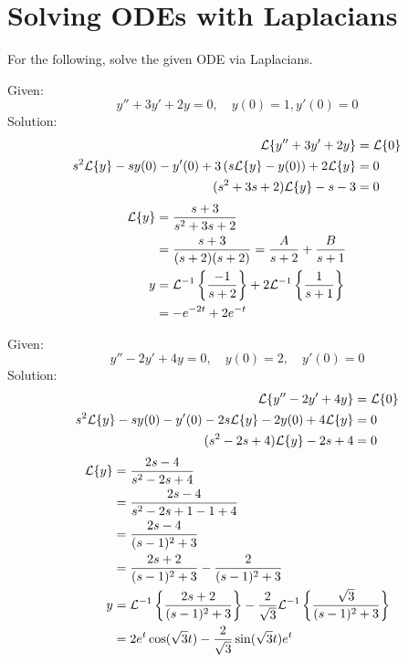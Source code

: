 \documentclass[diffeq.tex]{subfiles}
\begin{document}
\section{Solving ODEs with Laplacians}
For the following, solve the given ODE via Laplacians.
\begin{homework*}[255.9]
    Given:
    \begin{equation}
        y'' + 3y' + 2y = 0,\quad y(0) = 1, y'(0) = 0
    \end{equation}
    Solution:
    \begin{alignat}{1}
        \mathcal{L}\{y'' + 3y' + 2y\} &= \mathcal{L}\{0\}\\
        s^{2}\mathcal{L}\{y\} - sy(0) - y'(0) + 3\left(s\mathcal{L}\{y\} - y(0)\right) + 2\mathcal{L}\{y\} &= 0\\
        (s^{2} + 3s + 2)\mathcal{L}\{y\} - s - 3 &= 0\\
    \end{alignat}
    \begin{alignat}{1}
        \mathcal{L}\{y\} &= \frac{s + 3}{s^{2} + 3s + 2}\\
        &= \frac{s + 3}{(s + 2)(s + 2)} = \frac{A}{s + 2} + \frac{B}{s + 1}\\
        y &= \mathcal{L}^{-1}\left\{\frac{-1}{s+2}\right\} + 2 \mathcal{L}^{-1}\left\{\frac{1}{s + 1}\right\}\\
        &= -e^{-2t} + 2e^{-t}
    \end{alignat}
\end{homework*}
\begin{homework*}[255.11]
    Given:
    \begin{equation}
        y'' - 2y' + 4y = 0,\quad y(0) = 2,\quad y'(0) = 0
    \end{equation}
    Solution:
    \begin{alignat}{1}
        \mathcal{L}\{y'' - 2y' + 4y\} &= \mathcal{L}\{0\}\\
        s^{2}\mathcal{L}\{y\} - sy(0) - y'(0) - 2s\mathcal{L}\{y\} - 2y(0) + 4\mathcal{L}\{y\} &= 0\\
        (s^{2} - 2s + 4)\mathcal{L}\{y\} - 2s + 4 &= 0
    \end{alignat}
    \begin{alignat}{1}
        \mathcal{L}\{y\} &= \frac{2s - 4}{s^{2} - 2s + 4}\\
        &= \frac{2s - 4}{s^{2} -2s + 1 - 1 + 4}\\
        &= \frac{2s - 4}{(s - 1)^{2} + 3}\\
        &= \frac{2s + 2}{(s - 1)^{2} + 3} - \frac{2}{(s - 1)^{2} + 3}\\
        y &= \mathcal{L}^{-1}\left\{\frac{2s + 2}{(s - 1)^{2} + 3}\right\} - \frac{2}{\sqrt{3}}\mathcal{L}^{-1}\left\{\frac{\sqrt{3}}{(s - 1)^{2} + 3}\right\}\\
        &= 2e^{t}\cos(\sqrt{3}t) - \frac{2}{\sqrt{3}}\sin(\sqrt{3}t)e^{t}
    \end{alignat}
\end{homework*}
\end{document}
